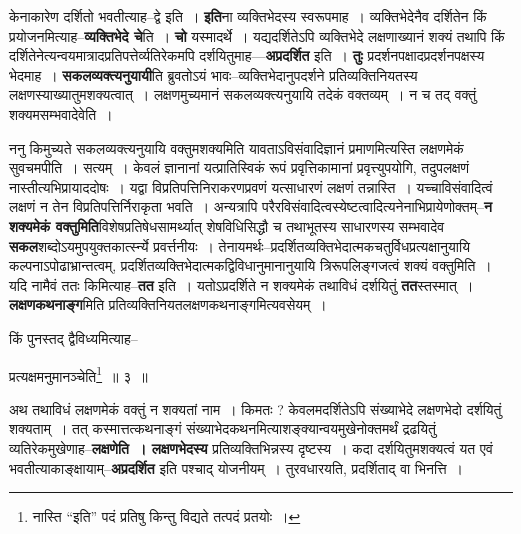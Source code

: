 \documentclass[article,12pt,a4paper]{memoir}
\begin{document}
	  \pstart केनाकारेण दर्शितो भवतीत्याह--द्वे इति । \textbf{इति}ना व्यक्तिभेदस्य स्वरूपमाह । व्यक्तिभेदेनैव दर्शितेन किं प्रयोजनमित्याह--\textbf{व्यक्तिभेदे चे}ति । \textbf{चो} यस्मादर्थे । यद्यदर्शितेऽपि व्यक्तिभेदे लक्षणाख्यानं शक्यं तथापि किं दर्शितेनेत्यन्वयमात्रादप्रतिपत्तेर्व्यतिरेकमपि दर्शयितुमाह—\textbf{अप्रदर्शित} इति । \textbf{तुः} प्रदर्शनपक्षादप्रदर्शनपक्षस्य भेदमाह । \textbf{सकलव्यक्त्यनुयायी}ति ब्रुवतोऽयं भावः--व्यक्तिभेदानुपदर्शने प्रतिव्यक्तिनियतस्य लक्षणस्याख्यातुमशक्यत्वात् । लक्षणमुच्यमानं सकलव्यक्त्यनुयायि तदेकं वक्तव्यम् । न च तद् वक्तुं शक्यमसम्भवादेवेति ।
	\pend
      

	  \pstart ननु किमुच्यते सकलव्यक्त्यनुयायि वक्तुमशक्यमिति यावताऽविसंवादिज्ञानं प्रमाणमित्यस्ति लक्षणमेकं सुवचमपीति । सत्यम् । केवलं ज्ञानानां यत्प्रातिस्विकं रूपं प्रवृत्तिकामानां प्रवृत्त्युपयोगि, तदुपलक्षणं नास्तीत्यभिप्रायाददोषः । यद्वा विप्रतिपत्तिनिराकरणप्रवणं यत्साधारणं लक्षणं तन्नास्ति । यच्चाविसंवादित्वं लक्षणं न तेन विप्रतिपत्तिर्निराकृता भवति । अन्यत्रापि परैरविसंवादित्वस्येष्टत्वादित्यनेनाभिप्रायेणोक्तम्--\textbf{न शक्यमेकं वक्तुमिति}विशेषप्रतिषेधसामर्थ्यात् शेषविधिसिद्धौ च तथाभूतस्य साधारणस्य सम्भवादेव \textbf{सकल}शब्दोऽयमुपयुक्तकार्त्स्न्ये प्रवर्त्त\leavevmode{}नीयः । तेनायमर्थः--प्रदर्शितव्यक्तिभेदात्मकचतुर्विधप्रत्यक्षानुयायि कल्पनाऽपोढाभ्रान्तत्वम्, प्रदर्शितव्यक्तिभेदात्मकद्विविधानुमानानुयायि त्रिरूपलिङ्गजत्वं शक्यं वक्तुमिति । यदि नामैवं ततः किमित्याह--\textbf{तत} इति । यतोऽप्रदर्शिते न शक्यमेकं तथाविधं दर्शयितुं \textbf{तत}स्तस्मात् । \textbf{लक्षणकथनाङ्ग}मिति प्रतिव्यक्तिनियतलक्षणकथनाङ्गमित्यवसेयम् ।
	\pend
      \leavevmode{}
	  \bigskip
	  \begingroup
	

	  \pstart किं पुनस्तद् द्वैविध्यमित्याह--
	\pend
       
	  \bigskip
	  \begingroup
	

	  \pstart प्रत्यक्षमनुमानञ्चेति\footnote{नास्ति “इति” पदं \cite{dp-msB} \cite{dp-edP} \cite{dp-edH} \cite{dp-edE} \cite{dp-edN} प्रतिषु किन्तु विद्यते तत्पदं \cite{dp-msC} \cite{dp-msD} प्रतयोः ।} ॥ ३ ॥
	\pend
      
	  \endgroup
	
	  \endgroup
	

	  \pstart अथ तथाविधं लक्षणमेकं वक्तुं न शक्यतां नाम । किमतः ? केवलमदर्शितेऽपि संख्याभेदे लक्षणभेदो दर्शयितुं शक्यताम् । तत् कस्मात्तत्कथनाङ्गं संख्याभेदकथनमित्याशङ्क्यान्वयमुखेनोक्तमर्थं द्रढयितुं व्यतिरेकमुखेणाह--\textbf{लक्षणेति । लक्षणभेदस्य} प्रतिव्यक्तिभिन्नस्य दृष्टस्य । कदा दर्शयितुमशक्यत्वं यत एवं भवतीत्याकाङ्क्षायाम्--\textbf{अप्रदर्शित} इति पश्चाद् योजनीयम् । तुरवधारयति, प्रदर्शिताद् वा भिनत्ति ।
	\pend
      
\end{document}
